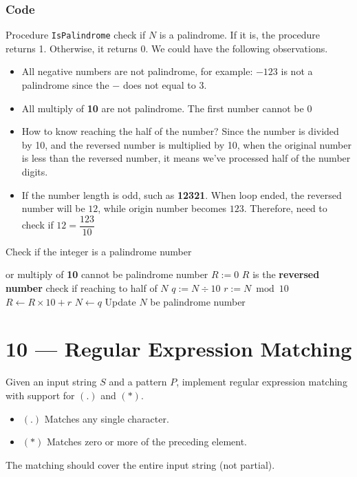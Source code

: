 \subsubsection{Code}
Procedure \texttt{IsPalindrome} check if $N$ is a palindrome. If it is, the procedure returns 1. Otherwise, it returns 0. We could have the following observations.
\begin{itemize}
\item All {\color{red}negative} numbers are not palindrome, for example: $-123$ is not a palindrome since the $-$ does not equal to $3$. 
\item All multiply of \textbf{10} are not palindrome. The first number cannot be {\color{red}0}
\item How to know reaching the {\color{red}half} of the number? Since the number is divided by 10, and the reversed number is multiplied by 10, when the original number is {\color{red}less than} the reversed number, it means we've processed half of the number digits.
\item If the number length is odd, such as \textbf{12321}. When loop ended, the reversed number will be $12$, while origin number becomes $123$. Therefore, need to check if $12 = \dfrac{123}{10}$
\end{itemize}
\setcounter{algorithm}{0}
\begin{algorithm}[H]
\caption{Check if the integer is a palindrome number}
\begin{algorithmic}[1]
\Statex
{}
  or multiply of \textbf{10} cannot be palindrome number
\State {}
\EndIf
\State \textbf{$R := 0$} \Comment $R$ is the \textbf{reversed number}
 \Comment check if reaching to half of $N$
\State $q := N\div 10$
\State $r := N\bmod 10$
\State $R \gets R\times 10 + r$
\State $N\gets q$ \Comment Update $N$
\EndWhile
{}  be palindrome number
\State {}
\Else
\State {}
\EndIf
\EndProcedure
\Statex
\end{algorithmic}
\end{algorithm}

\section{10 --- Regular Expression Matching}
Given an input string $S$ and a pattern $P$, implement regular expression matching with support for $(.)$ and $(\ast)$.
\begin{itemize}
\item $(.)$ Matches any single character.
\item $(\ast)$ Matches zero or more of the preceding element.
\end{itemize}
The matching should cover the entire input string (not partial).
